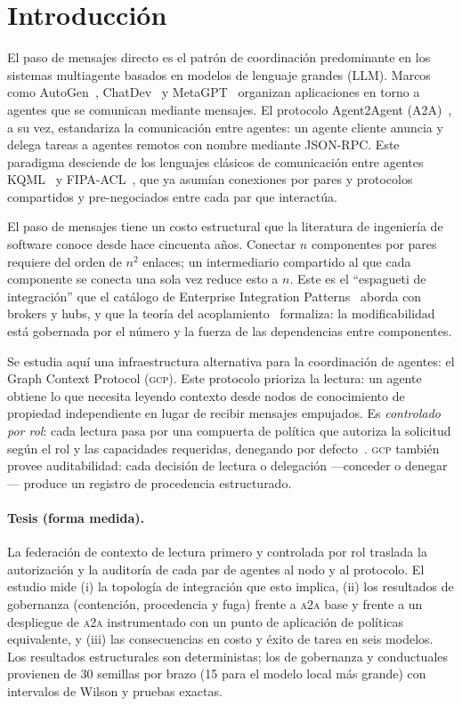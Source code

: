 \documentclass[conference,letterpaper]{IEEEtran}
\newcommand{\gcp}{\textsc{gcp}}
\newcommand{\ata}{\textsc{a2a}}
\begin{document}
\section{Introducci\'on}

El paso de mensajes directo es el patr\'on de coordinaci\'on predominante en los sistemas
multiagente basados en modelos de lenguaje grandes (LLM). Marcos como AutoGen~\citep{wu2023autogen},
ChatDev~\citep{qian2024chatdev} y MetaGPT~\citep{hong2024metagpt} organizan aplicaciones en torno a
agentes que se comunican mediante mensajes. El protocolo Agent2Agent (A2A)~\citep{a2a2025}, a su vez,
estandariza la comunicaci\'on entre agentes: un agente cliente anuncia y delega tareas a agentes
remotos con nombre mediante JSON-RPC. Este paradigma desciende de los lenguajes cl\'asicos de
comunicaci\'on entre agentes KQML~\citep{finin1994} y
FIPA-ACL~\citep{fipa2002}, que ya asum\'ian conexiones por pares y protocolos compartidos y
pre-negociados entre cada par que interact\'ua.

El paso de mensajes tiene un costo estructural que la literatura de ingenier\'ia de software conoce
desde hace cincuenta a\~nos. Conectar $n$ componentes por pares requiere del orden de $n^2$ enlaces;
un intermediario compartido al que cada componente se conecta una sola vez reduce esto a $n$. Este es
el ``espagueti de integraci\'on'' que el cat\'alogo de Enterprise Integration
Patterns~\citep{hohpe2003} aborda con brokers y hubs, y que la teor\'ia del
acoplamiento~\citep{parnas1972,stevens1974,briand1999} formaliza: la modificabilidad est\'a gobernada
por el n\'umero y la fuerza de las dependencias entre componentes.

Se estudia aqu\'i una infraestructura alternativa para la coordinaci\'on de agentes: el Graph Context
Protocol (\gcp{}). Este protocolo prioriza la lectura: un agente obtiene lo que necesita leyendo
contexto desde nodos de conocimiento de propiedad independiente en lugar de recibir mensajes
empujados. Es \emph{controlado por rol}: cada lectura pasa
por una compuerta de pol\'itica que autoriza la solicitud seg\'un el rol y las capacidades requeridas,
denegando por defecto~\citep{saltzer1975,sandhu1996}. \gcp{} tambi\'en provee auditabilidad: cada
decisi\'on de lectura o delegaci\'on ---conceder o denegar--- produce un registro de procedencia
estructurado.

\paragraph{Tesis (forma medida).} La federación de contexto de lectura primero y controlada por rol traslada la autorización y la auditoría de cada par de agentes al nodo y al protocolo. El estudio mide (i) la topología de integración que esto implica, (ii) los resultados de gobernanza (contención, procedencia y fuga) frente a \ata{} base y frente a un despliegue de \ata{} instrumentado con un punto de aplicación de políticas equivalente, y (iii) las consecuencias en costo y éxito de tarea en seis modelos. Los resultados estructurales son deterministas; los de gobernanza y conductuales provienen de 30 semillas por brazo (15 para el modelo local más grande) con intervalos de Wilson y pruebas exactas.
\end{document}

